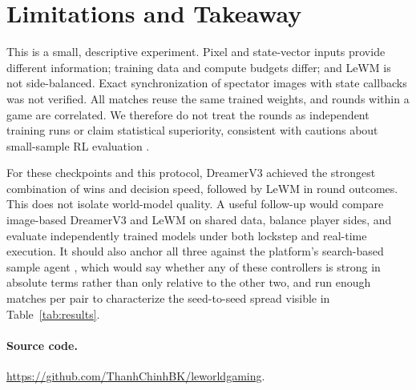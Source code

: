 \documentclass[10pt,twocolumn]{article}
\newcommand{\lewm}{LeWM}
\newcommand{\dreamer}{DreamerV3}
\begin{document}
\section{Limitations and Takeaway}

This is a small, descriptive experiment.  Pixel and state-vector inputs
provide different information; training data and compute budgets differ;
and \lewm{} is not side-balanced.  Exact synchronization of spectator
images with state callbacks was not verified.  All matches reuse the
same trained weights, and rounds within a game are correlated.  We therefore
do not treat the rounds as independent training runs or claim statistical
superiority, consistent with cautions about small-sample RL evaluation
\cite{agarwal2021precipice}.

For these checkpoints and this protocol, \dreamer{} achieved the strongest
combination of wins and decision speed, followed by \lewm{} in round
outcomes.  This does not isolate world-model quality.  A useful follow-up
would compare image-based \dreamer{} and \lewm{} on shared data, balance
player sides, and evaluate independently trained models under both lockstep
and real-time execution.  It should also anchor all three against the
platform's search-based sample agent \cite{yoshida2016mctsai}, which would
say whether any of these controllers is strong in absolute terms rather
than only relative to the other two, and run enough matches per pair to
characterize the seed-to-seed spread visible in Table~\ref{tab:results}.

\paragraph{Source code.}
\url{https://github.com/ThanhChinhBK/leworldgaming}.

{\footnotesize


}
\end{document}
